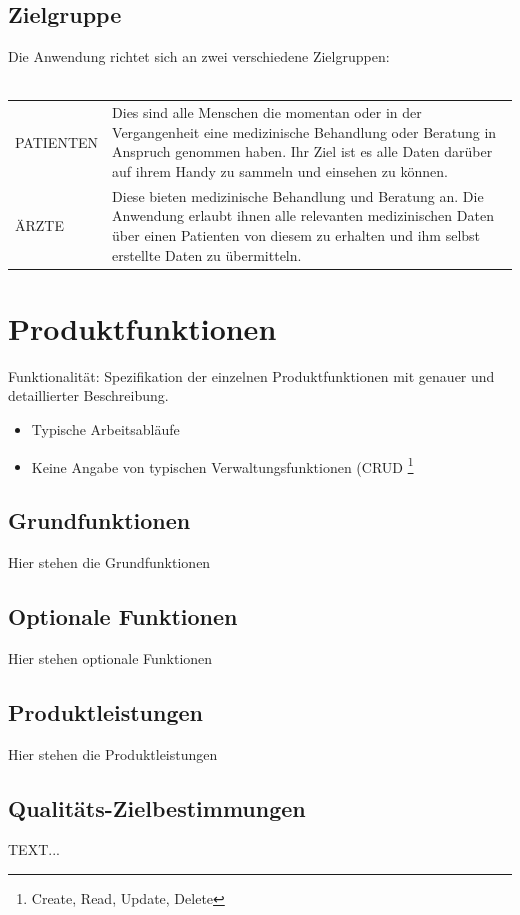 \documentclass[a4paper]{scrreprt}
\begin{document}
\section{Zielgruppe}
Die Anwendung richtet sich an zwei verschiedene Zielgruppen:  \\\\
\begin{tabular}{lll}
PATIENTEN &  \multicolumn{2}{p{12cm}}{Dies sind alle Menschen die momentan oder in der Vergangenheit eine medizinische Behandlung oder Beratung in Anspruch genommen haben. Ihr Ziel ist es alle Daten darüber auf ihrem Handy zu sammeln und einsehen zu können.}\\
ÄRZTE &  \multicolumn{2}{p{12cm}}{Diese bieten medizinische Behandlung und Beratung an. Die Anwendung erlaubt ihnen alle relevanten medizinischen Daten über einen Patienten von diesem zu erhalten und ihm selbst erstellte Daten zu übermitteln.}  \\
\end{tabular}

\chapter{Produktfunktionen}
Funktionalität: Spezifikation der einzelnen Produktfunktionen mit genauer und detaillierter Beschreibung.

\begin{itemize}
  \item Typische Arbeitsabläufe
  \item Keine Angabe von typischen Verwaltungsfunktionen (CRUD \footnote{Create,
Read, Update, Delete}
\end{itemize}

\section{Grundfunktionen}
Hier stehen die Grundfunktionen

\section{Optionale Funktionen}
Hier stehen optionale Funktionen

\section{Produktleistungen}
Hier stehen die Produktleistungen

\section{Qualitäts-Zielbestimmungen}
TEXT...
\end{document}

